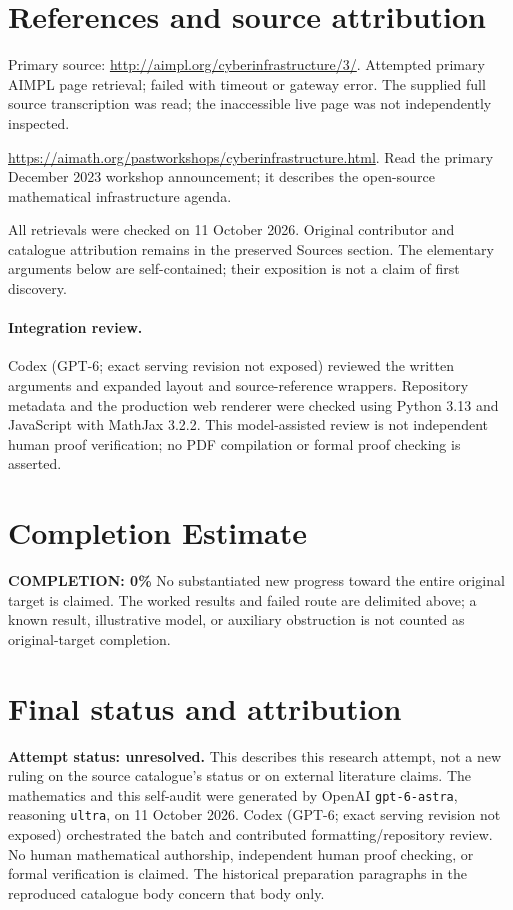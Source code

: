 \documentclass[11pt]{article}
\begin{document}
\section{References and source attribution}
Primary source: \url{http://aimpl.org/cyberinfrastructure/3/}. Attempted primary AIMPL page retrieval; failed with timeout or gateway error. The supplied full source transcription was read; the inaccessible live page was not independently inspected.

\url{https://aimath.org/pastworkshops/cyberinfrastructure.html}. Read the primary December 2023 workshop announcement; it describes the open-source mathematical infrastructure agenda.

All retrievals were checked on 11 October 2026. Original contributor and catalogue attribution remains in the preserved Sources section. The elementary arguments below are self-contained; their exposition is not a claim of first discovery.


\paragraph{Integration review.} Codex (GPT-6; exact serving revision not exposed) reviewed the written arguments and expanded layout and source-reference wrappers. Repository metadata and the production web renderer were checked using Python 3.13 and JavaScript with MathJax 3.2.2. This model-assisted review is not independent human proof verification; no PDF compilation or formal proof checking is asserted.

\section{Completion Estimate}
\noindent\textbf{COMPLETION: 0\%}
No substantiated new progress toward the entire original target is claimed. The worked results and failed route are delimited above; a known result, illustrative model, or auxiliary obstruction is not counted as original-target completion.

\section{Final status and attribution}
\textbf{Attempt status: unresolved.} This describes this research attempt, not a new ruling on the source catalogue's status or on external literature claims.
The mathematics and this self-audit were generated by OpenAI \texttt{gpt-6-astra}, reasoning \texttt{ultra}, on 11 October 2026. Codex (GPT-6; exact serving revision not exposed) orchestrated the batch and contributed formatting/repository review. No human mathematical authorship, independent human proof checking, or formal verification is claimed. The historical preparation paragraphs in the reproduced catalogue body concern that body only.
\end{document}
